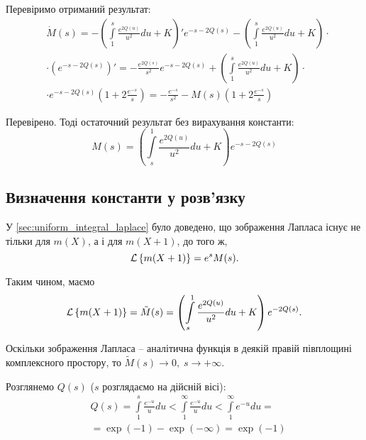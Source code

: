 Перевіримо отриманий результат:
\begin{equation*}
\begin{split}
	&\dot M(s) = -\left( \int\limits_1^s \frac{e^{2Q(u)}}{u^2} du + K \right)' e^{- s - 2Q(s)} -\left( \int\limits_1^s \frac{e^{2Q(u)}}{u^2} du + K \right)\cdot \\ 
	&\cdot \left(e^{- s - 2Q(s)}\right)' = -\frac{e^{2Q(s)}}{s^2} e^{- s - 2Q(s)}  + \left( \int\limits_1^s \frac{e^{2Q(u)}}{u^2} du + K \right) \cdot \\
	& \cdot e^{- s - 2Q(s)} \left(1 + 2 \frac{e^{-s}}{s}\right) = -\frac{e^{-s}}{s^2} - M(s)\left(1 + 2 \frac{e^{-s}}{s}\right)
\end{split}
\end{equation*}

Перевірено. Тоді остаточний результат без вирахування константи:
\begin{equation}
	\label{eq:uniform_laplace_sol_initial}
	M(s)= \left( \int\limits_s^1 \frac{e^{2Q(u)}}{u^2} du + K \right) e^{- s - 2Q(s)}
\end{equation}

\subsection{Визначення константи у розв'язку}

У \ref{sec:uniform_integral_laplace} було доведено, що зображення Лапласа існує не тільки для $m(X)$, а і для $m(X+1)$, до того ж,
\begin{equation}
	\mathcal{L}\left\{m(X+1)\right\} = e^s M(s).
\end{equation}

Таким чином, маємо
\begin{equation}
	\mathcal{L}\left\{m(X+1)\right\} =\tilde M(s)= \left( \int\limits_s^1 \frac{e^{2Q(u)}}{u^2} du + K \right) e^{- 2Q(s)}.
\end{equation}

Оскільки зображення Лапласа – аналітична функція в деякій правій півплощині комплексного простору, то $\tilde M(s) \rightarrow 0,\; s \rightarrow +\infty$.

Розглянемо $Q(s)$ ($s$ розглядаємо на дійсній вісі):
\begin{equation}
\begin{split}
	&Q(s) = \int\limits_1^s \frac{e^{-u}}{u} du <  \int\limits_1^\infty \frac{e^{-u}}{u} du < 
	\int\limits_1^\infty e^{-u} du=\\
	&= \exp(-1) - \exp(-\infty) = \exp(-1)
\end{split}
\end{equation}

